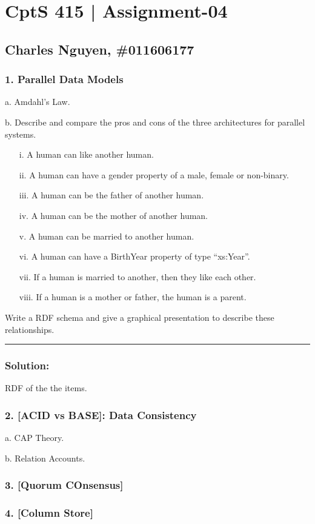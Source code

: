 \documentclass[12pt,letterpaper]{article}
\begin{document}
\section*{CptS 415 | Assignment-04 }

\subsection*{Charles Nguyen, \#011606177 }

\subsubsection*{1. \textbf{Parallel Data Models}}

a. Amdahl's Law.

b. Describe and compare the pros and cons of the three architectures for parallel systems.

\begin{enumerate}
    \item[i.    ] A human can like another human.
    \item[ii.   ] A human can have a gender property of a male, female or non-binary.
    \item[iii.  ] A human can be the father of another human.
    \item[iv.   ] A human can be the mother of another human.
    \item[v.    ] A human can be married to another human.
    \item[vi.   ] A human can have a BirthYear property of type “xs:Year”.
    \item[vii.  ] If a human is married to another, then they like each other.
    \item[viii. ] If a human is a mother or father, the human is a parent.
\end{enumerate}

Write a RDF schema and give a graphical presentation to describe these
relationships.

\hrule

\subsubsection*{Solution:}

RDF of the the items.

\pagebreak

\subsubsection*{2. \textbf{[ACID vs BASE]: Data Consistency}}

a. CAP Theory.

b. Relation Accounts.

\pagebreak

\subsubsection*{3. \textbf{[Quorum COnsensus]}}

\pagebreak

\subsubsection*{4. \textbf{[Column Store]}}
\end{document}
